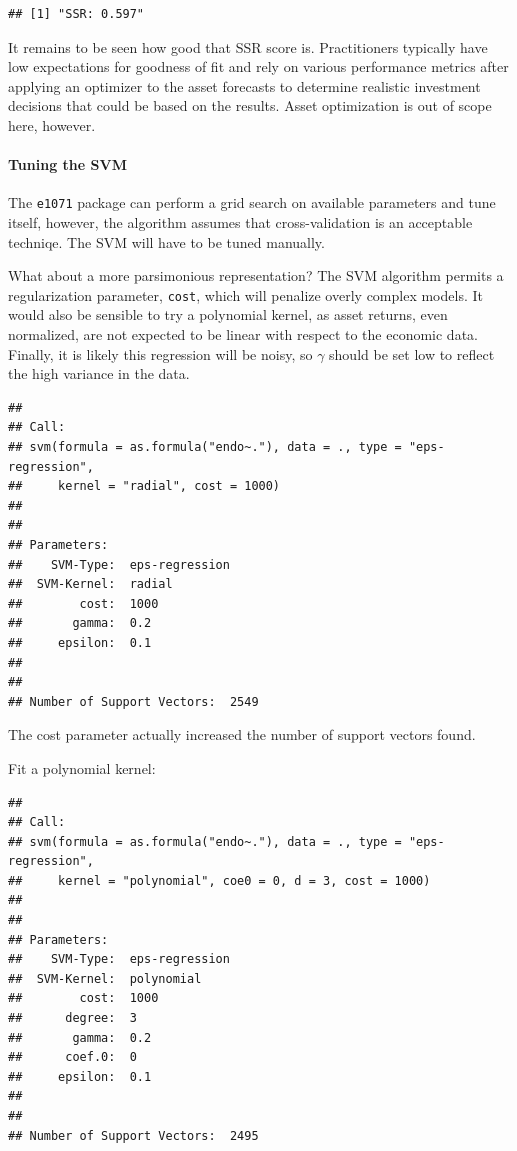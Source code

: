 \documentclass[]{article}
\let\oldparagraph\paragraph
\renewcommand{\paragraph}[1]{\oldparagraph{#1}\mbox{}}
\begin{document}
\begin{verbatim}
## [1] "SSR: 0.597"
\end{verbatim}

It remains to be seen how good that SSR score is. Practitioners
typically have low expectations for goodness of fit and rely on various
performance metrics after applying an optimizer to the asset forecasts
to determine realistic investment decisions that could be based on the
results. Asset optimization is out of scope here, however.

\paragraph{Tuning the SVM}\label{tuning-the-svm}

The \texttt{e1071} package can perform a grid search on available
parameters and tune itself, however, the algorithm assumes that
cross-validation is an acceptable techniqe. The SVM will have to be
tuned manually.

What about a more parsimonious representation? The SVM algorithm permits
a regularization parameter, \texttt{cost}, which will penalize overly
complex models. It would also be sensible to try a polynomial kernel, as
asset returns, even normalized, are not expected to be linear with
respect to the economic data. Finally, it is likely this regression will
be noisy, so \(\gamma\) should be set low to reflect the high variance
in the data.

\begin{verbatim}
## 
## Call:
## svm(formula = as.formula("endo~."), data = ., type = "eps-regression", 
##     kernel = "radial", cost = 1000)
## 
## 
## Parameters:
##    SVM-Type:  eps-regression 
##  SVM-Kernel:  radial 
##        cost:  1000 
##       gamma:  0.2 
##     epsilon:  0.1 
## 
## 
## Number of Support Vectors:  2549
\end{verbatim}

The cost parameter actually increased the number of support vectors
found.

Fit a polynomial kernel:

\begin{verbatim}
## 
## Call:
## svm(formula = as.formula("endo~."), data = ., type = "eps-regression", 
##     kernel = "polynomial", coe0 = 0, d = 3, cost = 1000)
## 
## 
## Parameters:
##    SVM-Type:  eps-regression 
##  SVM-Kernel:  polynomial 
##        cost:  1000 
##      degree:  3 
##       gamma:  0.2 
##      coef.0:  0 
##     epsilon:  0.1 
## 
## 
## Number of Support Vectors:  2495
\end{verbatim}
\end{document}
